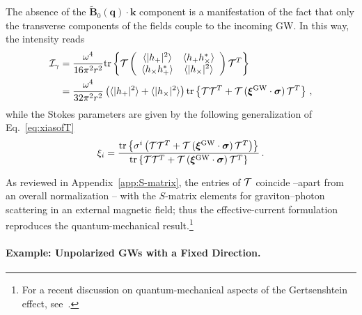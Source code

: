 \documentclass[a4paper,11pt]{article}
\begin{document}
The absence of the $\tilde{\bm{B}}_0 (\bm{q}) \cdot \bm{k} $ component is a manifestation of the fact that only the transverse components of the fields couple to the incoming GW.
%
In this way, the intensity reads
\begin{equation}
\begin{aligned}
\mathcal{I}_\gamma &= \frac{\omega^4}{16 \pi^2 r^2}
{\rm tr} \left\{
{\cal T}
\left(
\begin{array}{cc}
 \langle |h_+|^2 \rangle &\langle h_+ h_\times^* \rangle \\
 \langle h_\times h_+^* \rangle & \langle |h_\times|^2 \rangle
\end{array}
\right)
{\cal T}^T
\right\} \\
&=
\frac{\omega^4}{32 \pi^2 r^2} \left( \langle |h_+|^2 \rangle + \langle |h_\times|^2 \rangle \right)
\text{tr} \left\{ {\cal T} {\cal T}^T + {\cal T} \, (\bm{\xi}^{\text{GW}} \cdot \bm{\sigma}) \, {\cal T}^T \right\}
\label{eq:Igamma}
\,,
\end{aligned}
\end{equation}
while the Stokes parameters are given by the following generalization of Eq.~\eqref{eq:xiasofT}
\begin{align}
\xi_i = \frac{\text{tr} \left\{ \sigma^i \left( {\cal T} {\cal T}^T + {\cal T} \, (\bm{\xi}^{\text{GW}} \cdot \bm{\sigma}) \, {\cal T}^T \right) \right\}}
{\text{tr} \left\{ {\cal T} {\cal T}^T + {\cal T} \, (\bm{\xi}^{\text{GW}} \cdot \bm{\sigma}) \, {\cal T}^T \right\}} \, .
\end{align}


As reviewed in Appendix~\ref{app:S-matrix}, the entries of ${\cal T}$ coincide --apart from an overall normalization -- with the $S$-matrix elements for graviton–photon scattering in an external magnetic field; thus the effective-current formulation reproduces the quantum-mechanical result.\footnote{For a recent  discussion on quantum-mechanical aspects of the Gertsenshtein effect, see~\cite{Ikeda:2025uae}.  }



\paragraph{Example: Unpolarized GWs with a Fixed Direction.} 
\end{document}
